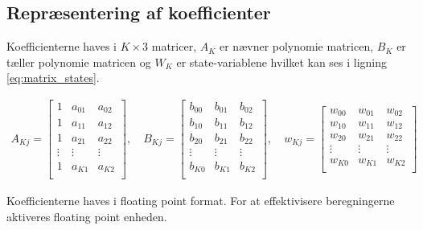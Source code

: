 \subsection{Repræsentering af koefficienter}

    Koefficienterne haves i $K \times 3$ matricer,
    $A_K$ er nævner polynomie matricen, $B_K$ er tæller polynomie matricen
   og $W_K$ er state-variablene hvilket kan ses i ligning \ref{eq:matrix_states}.  

   \begin{align}
   A_{Kj} = \left[\begin{matrix}
   1 			& a_{01} 	& a_{02} \\
   1 			& a_{11} 	& a_{12} \\
   1 			& a_{21} 	& a_{22} \\
   \vdots 		& \vdots 	&  \vdots \\
   1 			& a_{K1} 	& a_{K2} \\
   \end{matrix}
   \right], \quad
      B_{Kj} = \left[\begin{matrix}
   b_{00}		& b_{01} 	& b_{02} \\
   b_{10}		& b_{11} 	& b_{12} \\
   b_{20}		& b_{21} 	& b_{22} \\
   \vdots 		& \vdots 	&  \vdots \\
   b_{K0}		& b_{K1} 	& b_{K2} \\
   \end{matrix}
   \right], \quad
      w_{Kj} = \left[\begin{matrix}
   w_{00}		& w_{01} 	& w_{02} \\
   w_{10}		& w_{11} 	& w_{12} \\
   w_{20}		& w_{21} 	& w_{22} \\
   \vdots 		& \vdots 	&  \vdots \\
   w_{K0}		& w_{K1} 	& w_{K2} \\
   \end{matrix}
   \right]
   \label{eq:matrix_states}
   \end{align}

   Koefficienterne haves i floating point format. For at effektivisere beregningerne aktiveres floating point 
   enheden. 
